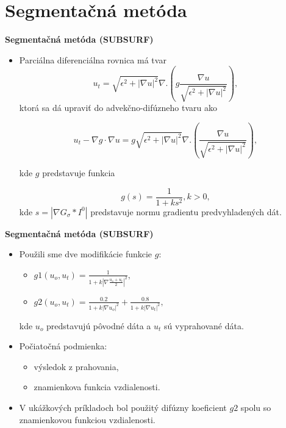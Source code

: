 \documentclass{beamer}
\begin{document}
\section{Segmentačná metóda}

\begin{frame}{\textbf{Segmentačná metóda (SUBSURF)}}
	\begin{itemize}
	\item Parciálna diferenciálna rovnica má tvar
	$$
u_t = \sqrt{\epsilon^2 + |\nabla u|^2}\nabla.\left(g \frac{\nabla u}{\sqrt{\epsilon^2 + |\nabla u|^2}}\right),
$$
ktorá sa dá upraviť do advekčno-difúzneho tvaru ako 

	$$
u_t-\nabla g\cdot \nabla u=g \sqrt{\epsilon^2 + |\nabla u|^2}\nabla.\left( \frac{\nabla u}{\sqrt{\epsilon^2 + |\nabla u|^2}}\right),
$$

kde $g$ predstavuje funkcia

	 $$g(s) = \frac{1}{1+ks^2}, k > 0,$$
kde $s = |\nabla G_{\sigma} * I^0|$ predstavuje normu gradientu predvyhladených dát.
	\end{itemize}
\end{frame}

\begin{frame}{\textbf{Segmentačná metóda (SUBSURF)}}
	\begin{itemize}
	\item Použili sme dve modifikácie funkcie $g$:
	\begin{itemize} 
	\item $g1(u_o , u_t) = \frac{1}{1 + k|\nabla \frac{u_o + u_t}{2}|^2},$
	\item $g2(u_o , u_t) = \frac{0.2}{1 + k|\nabla u_o|^2} + \frac{0.8}{1 + k|\nabla u_t|^2},$
	\end{itemize}
	kde $u_o$ predstavujú pôvodné dáta a $u_t$ sú vyprahované dáta.
	\vspace{2mm}
	\item Počiatočná podmienka:
	\begin{itemize}
	\item výsledok z prahovania,
	\item znamienkova funkcia vzdialenosti.
	\end{itemize}
	\vspace{2mm}	
	\item V ukážkových príkladoch bol použitý difúzny koeficient $g2$ spolu so znamienkovou funkciou vzdialenosti. 
	\end{itemize}
\end{frame}
\end{document}
